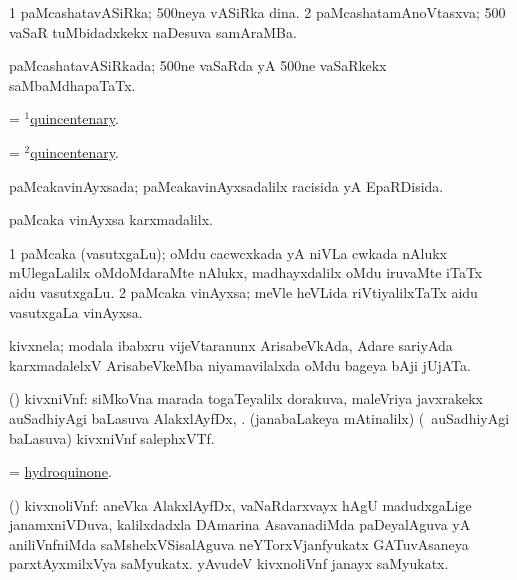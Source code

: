 \bentry
{}
\gl{\nA}
\bmng
\bnum
\num{1} paMcashatavASiRka; {\rm 500}neya vASiRka dina. 
\num{2} paMcashatamAnoVtasxva; {\rm 500} vaSaR tuMbidadxkekx naDesuva samAraMBa. 
\enum
\emng
\eentry


\bentry
{}
\gl{\gu}
\bmng
paMcashatavASiRkada; {\rm 500}ne vaSaRda yA {\rm 500}ne vaSaRkekx saMbaMdhapaTaTx. 
\emng
\eentry


\bentry
{}
\gl{\nA}
\bmng
= \hyperlink{quincentenary(1)}{$^1$quincentenary}. 
\emng
\eentry

\bentry
{}
\gl{\gu}
\expl{}
\bmng
= \hyperlink{quincentenary(2)}{$^2$quincentenary}. 
\emng
\eentry

\bentry
{}
\gl{\gu}
\expl{}
\bmng
paMcakavinAyxsada; paMcakavinAyxsadalilx racisida yA EpaRDisida. 
\emng
\eentry

\bentry
{}
\gl{\kirxvi}
\bmng
paMcaka vinAyxsa karxmadalilx. 
\emng
\eentry

\bentry
{}
\gl{\nA}
\bmng
\bnum
\num{1} paMcaka (vasutxgaLu); oMdu cacwcxkada yA niVLa cwkada nAlukx mUlegaLalilx oMdoMdaraMte nAlukx, madhayxdalilx oMdu iruvaMte iTaTx aidu vasutxgaLu. 
\num{2} paMcaka vinAyxsa; meVle heVLida riVtiyalilxTaTx aidu vasutxgaLa vinAyxsa. 
\enum
\emng
\eentry

\bentry
{}
\gl{\nA}
\bmng
kivxnela; modala ibabxru vijeVtaranunx ArisabeVkAda, Adare sariyAda karxmadalelxV ArisabeVkeMba niyamavilalxda oMdu bageya bAji jUjATa. 
\emng
\eentry

\bentry
{}
\gl{\nA}
\expl{}
\bmng
(\ravi) kivxniVnf: 
\banum
{} siMkoVna marada togaTeyalilx dorakuva, maleVriya javxrakekx auSadhiyAgi baLasuva AlakxlAyfDx, . 
 (janabaLakeya mAtinalilx) (\sA\ auSadhiyAgi baLasuva) kivxniVnf salephxVTf. 
\eanum
\emng
\eentry

\bentry
{}
\gl{\nA}
\bmng
= \hyperref{kandict_h.pdf}{H}{hydroquinone}{hydroquinone}. 
\emng
\eentry

\bentry
{}
\gl{\nA}
\bmng
(\ravi) kivxnoliVnf: 
\banum
{} aneVka AlakxlAyfDx, vaNaR\-darxvayx hAgU madudxgaLige janamxniVDuva, kalilxdadxla DAmarina AsavanadiMda paDeyalAguva yA aniliVnfniMda saMshelxVSisalAguva neYTorxVjanfyukatx GATuvAsaneya parxtAyxmilxVya saMyukatx. 
 yAvudeV kivxnoliVnf janayx saMyukatx. 
\eanum
\emng
\eentry

